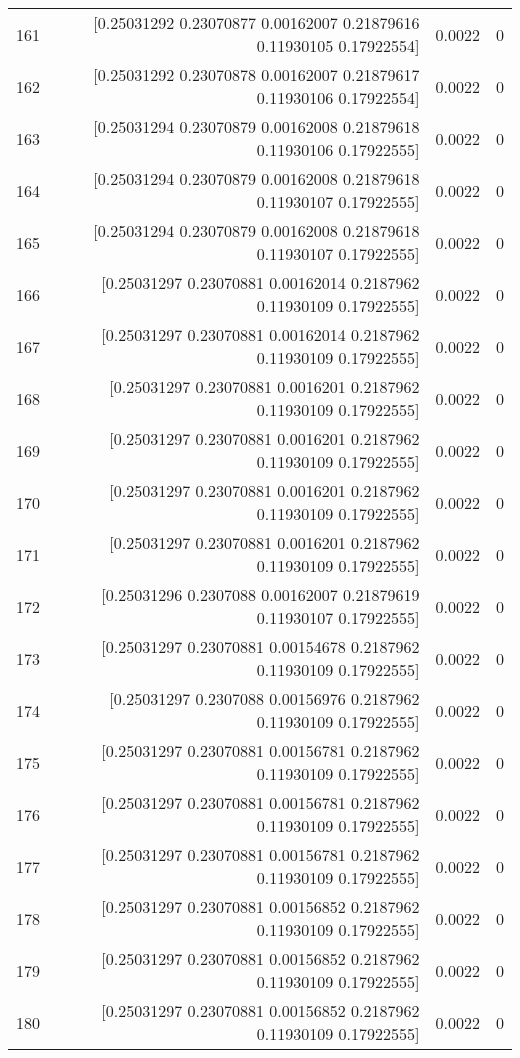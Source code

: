 \begin{longtable}{lrrr}
161 & [0.25031292 0.23070877 0.00162007 0.21879616 0.11930105 0.17922554] & 0.0022 & 0 \\
162 & [0.25031292 0.23070878 0.00162007 0.21879617 0.11930106 0.17922554] & 0.0022 & 0 \\
163 & [0.25031294 0.23070879 0.00162008 0.21879618 0.11930106 0.17922555] & 0.0022 & 0 \\
164 & [0.25031294 0.23070879 0.00162008 0.21879618 0.11930107 0.17922555] & 0.0022 & 0 \\
165 & [0.25031294 0.23070879 0.00162008 0.21879618 0.11930107 0.17922555] & 0.0022 & 0 \\
166 & [0.25031297 0.23070881 0.00162014 0.2187962  0.11930109 0.17922555] & 0.0022 & 0 \\
167 & [0.25031297 0.23070881 0.00162014 0.2187962  0.11930109 0.17922555] & 0.0022 & 0 \\
168 & [0.25031297 0.23070881 0.0016201  0.2187962  0.11930109 0.17922555] & 0.0022 & 0 \\
169 & [0.25031297 0.23070881 0.0016201  0.2187962  0.11930109 0.17922555] & 0.0022 & 0 \\
170 & [0.25031297 0.23070881 0.0016201  0.2187962  0.11930109 0.17922555] & 0.0022 & 0 \\
171 & [0.25031297 0.23070881 0.0016201  0.2187962  0.11930109 0.17922555] & 0.0022 & 0 \\
172 & [0.25031296 0.2307088  0.00162007 0.21879619 0.11930107 0.17922555] & 0.0022 & 0 \\
173 & [0.25031297 0.23070881 0.00154678 0.2187962  0.11930109 0.17922555] & 0.0022 & 0 \\
174 & [0.25031297 0.2307088  0.00156976 0.2187962  0.11930109 0.17922555] & 0.0022 & 0 \\
175 & [0.25031297 0.23070881 0.00156781 0.2187962  0.11930109 0.17922555] & 0.0022 & 0 \\
176 & [0.25031297 0.23070881 0.00156781 0.2187962  0.11930109 0.17922555] & 0.0022 & 0 \\
177 & [0.25031297 0.23070881 0.00156781 0.2187962  0.11930109 0.17922555] & 0.0022 & 0 \\
178 & [0.25031297 0.23070881 0.00156852 0.2187962  0.11930109 0.17922555] & 0.0022 & 0 \\
179 & [0.25031297 0.23070881 0.00156852 0.2187962  0.11930109 0.17922555] & 0.0022 & 0 \\
180 & [0.25031297 0.23070881 0.00156852 0.2187962  0.11930109 0.17922555] & 0.0022 & 0 \\

\end{longtable}
